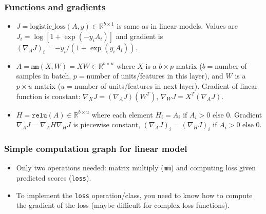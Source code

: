 \documentclass{beamer}
\begin{document}
\begin{frame}
  \frametitle{Functions and gradients}
  \begin{itemize}
  \item $J = \text{logistic\_loss}(A, y)\in\mathbb R^{b\times 1}$ is
    same as in linear models. Values are
    $J_i = \log[1+\exp(-y_i A_i)]$ and gradient is
    $(\nabla_A J)_i = -y_i/(1+\exp(y_i A_i))$.
  \item $A = \texttt{mm}(X, W) = XW \in\mathbb R^{b\times u}$ where
    $X$ is a $b \times p$ matrix ($b=$number of samples in batch,
    $p=$number of units/features in this layer), and $W$ is a
    $p \times u$ matrix ($u=$number of units/features in next
    layer). Gradient of linear function is constant:
    $\nabla_X J = (\nabla_A J) (W^T)$,
    $\nabla_W J = X^T (\nabla_A J)$.
  \item $H = \texttt{relu}(A) \in\mathbb R^{b\times u}$ where each
    element $H_i = A_i\text{ if } A_i > 0\text{ else } 0$. Gradient
    $\nabla_A J = \nabla_A H \nabla_H J$ is piecewise constant, $(\nabla_A J)_i= (\nabla_H J)_i \text{ if } A_i > 0 \text{ else } 0$.
  \end{itemize}
  
\end{frame}

\begin{frame}
  \frametitle{Simple computation graph for linear model}
  \begin{itemize}
  \item Only two operations needed: matrix multiply (\texttt{mm}) and
    computing loss given predicted scores (\texttt{loss}).
  \item To implement the \texttt{loss} operation/class, you need to
    know how to compute the gradient of the loss (maybe difficult for
    complex loss functions).
  \end{itemize}


\end{frame}
\end{document}
